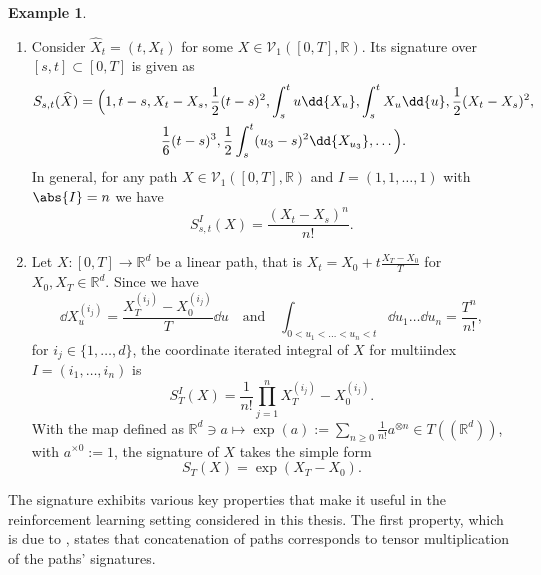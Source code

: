 \documentclass[
    a4paper,
    11pt,
    bibliography=totoc,
    listof=totoc,      
    headinclude=true,
    cleardoublepage=empty,
]{scrbook}
\theoremstyle{plain}
\theoremstyle{definition}
\newtheorem{example}[theorem]{Example}
\theoremstyle{remark}
\newcommand{\SetR}{\mathbb R}
\begin{document}
\begin{example}
\label{exa:SigExamples}
    \begin{enumerate}
        \item \label{exa:SigExamples:item:TimeAugmentedPath}
        Consider $\widehat{X}_t = (t,X_t)$ for some $X \in
        \mathcal{V}_1([0,T],\SetR)$. Its signature over $[s,t] \subset [0,T]$
        is given as
        \begin{multline*}
            S_{s,t}(\widehat{X})
            = \Bigl(1, t-s, X_t-X_s, 
                \frac{1}{2}(t-s)^2, \int_s^t u \dd{X_u}, \int_s^t X_u \dd{u},
                    \frac{1}{2}(X_t - X_s)^2, \\
                \frac{1}{6}(t-s)^3, \frac{1}{2} \int_s^t (u_3-s)^2 
                    \dd{ X_{u_3}}, \dots \Bigr).   
        \end{multline*}
        In general, for any path $X \in \mathcal{V}_1([0,T],\SetR)$ and 
        $I=(1,1,\dots,1)$  with $\abs{I}=n$ we have
        \[
            S^I_{s,t}(X) = \frac{(X_t-X_s)^n}{n!}.
        \]
        
        \item \label{exa:SigExamples:item:LinearPath}
        Let $X:[0,T]\to\SetR^d$ be a linear path, that is 
        $X_t=X_0+t\frac{X_T-X_0}{T}$ for $X_0,X_T \in \SetR^d$. Since we
        have
        \[
            \dd{X^{(i_j)}_u} = \frac{X_T^{(i_j)}-X_0^{(i_j)}}{T} \dd{u}
            \quad \text{and} \quad
            \int_{0<u_1<\dots<u_n<t} \dd{u_1} \dots \dd{u_n} = \frac{T^n}{n!},
        \]
        for $i_j \in \{1,\dots,d\}$, the coordinate iterated integral of $X$
        for multiindex $I=(i_1,\dots,i_n)$ is
            \begin{equation}      
                S^I_T(X) 
                = \frac{1}{n!}\prod_{j=1}^n X_T^{(i_j)}-X_0^{(i_j)}.
            \end{equation}
        With the map defined as $\SetR^d \ni a \mapsto \exp(a) := 
        \sum_{n\geq0} \frac{1}{n!} a^{\otimes n} \in T((\SetR^d))$, with 
        $a^{\times 0} := 1$, the signature of $X$ takes the simple form 
        \begin{equation}
            S_T(X) = \exp(X_T - X_0).
        \end{equation}
    \end{enumerate}
\end{example}

The signature exhibits various key properties that make it useful in the
reinforcement learning setting considered in this thesis. The first property, 
which is due to \cite{chen1957_ipgigbhf, chen1977_ipi}, states that 
concatenation of paths corresponds to tensor multiplication of the paths'
signatures. 
\end{document}
